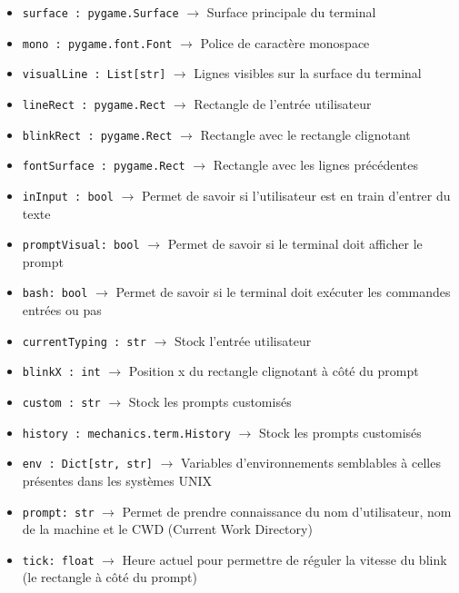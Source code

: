 \documentclass{report}
\begin{document}
\begin{itemize}
  \item \texttt{surface : pygame.Surface}		$\rightarrow$ Surface principale du terminal
  \item \texttt{mono : pygame.font.Font}		$\rightarrow$ Police de caractère monospace
  \item \texttt{visualLine : List[str]}		$\rightarrow$ Lignes visibles sur la surface du terminal
  \item \texttt{lineRect : pygame.Rect}		$\rightarrow$ Rectangle de l’entrée utilisateur
  \item \texttt{blinkRect : pygame.Rect}		$\rightarrow$ Rectangle avec le rectangle clignotant
  \item \texttt{fontSurface : pygame.Rect}		$\rightarrow$ Rectangle avec les lignes précédentes
  \item \texttt{inInput : bool}			$\rightarrow$ Permet de savoir si l’utilisateur est en train d'entrer du texte
  \item \texttt{promptVisual: bool}			$\rightarrow$ Permet de savoir si le terminal doit afficher le prompt
  \item \texttt{bash: bool}				$\rightarrow$ Permet de savoir si le terminal doit exécuter les commandes entrées ou pas
  \item \texttt{currentTyping : str}		$\rightarrow$ Stock l’entrée utilisateur
  \item \texttt{blinkX : int}			$\rightarrow$ Position x du rectangle clignotant à côté du prompt
  \item \texttt{custom : str}			$\rightarrow$ Stock les prompts customisés
  \item \texttt{history : mechanics.term.History}	$\rightarrow$ Stock les prompts customisés
  \item \texttt{env : Dict[str, str]}		$\rightarrow$ Variables d'environnements semblables à celles présentes dans les systèmes UNIX
  \item \texttt{prompt: str}		$\rightarrow$ Permet de prendre connaissance du nom d’utilisateur, nom de la machine et le CWD (Current Work Directory)
  \item \texttt{tick: float}		$\rightarrow$ Heure actuel pour permettre de réguler la vitesse du blink (le rectangle à côté du prompt)

\end{itemize}
\end{document}
